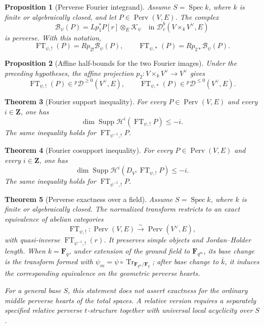 \documentclass[10pt]{article}
\newtheorem{theorem}{Theorem}[section]
\newtheorem{proposition}[theorem]{Proposition}
\theoremstyle{definition}
\newcommand{\Fq}{\mathbf F_q}
\newcommand{\Db}{\mathcal D}
\newcommand{\Dbc}{\mathcal D^b_c}
\newcommand{\FT}{\operatorname{FT}}
\newcommand{\Tr}{\operatorname{Tr}}
\newcommand{\Spec}{\operatorname{Spec}}
\newcommand{\Perv}{\operatorname{Perv}}
\begin{document}
\begin{proposition}[Perverse Fourier integrand]
Assume \(S=\Spec k\), where \(k\) is finite or algebraically closed, and let
\(P\in\Perv(V,E)\).  The complex
\[
 \mathcal B_\psi(P)=Lp_1^*P[r]\otimes_E\mathcal K_\psi
 \quad\text{in }\Dbc(V\times_kV^\vee,E)
\]
is perverse.  With this notation,
\[
 \FT_{\psi,!}(P)=Rp_{2!}\mathcal B_\psi(P),
 \qquad
 \FT_{\psi,*}(P)=Rp_{2*}\mathcal B_\psi(P).
\]
\end{proposition}

\begin{proposition}[Affine half-bounds for the two Fourier images]
Under the preceding hypotheses, the affine projection
\(p_2:V\times_kV^\vee\to V^\vee\) gives
\[
 \FT_{\psi,!}(P)\in{}^p\Db^{\ge0}(V^\vee,E),
 \qquad
 \FT_{\psi,*}(P)\in{}^p\Db^{\le0}(V^\vee,E).
\]
\end{proposition}

\begin{theorem}[Fourier support inequality]
For every \(P\in\Perv(V,E)\) and every \(i\in\mathbf Z\), one has
\[
 \dim\operatorname{Supp}\mathcal H^i(\FT_{\psi,!}P)\le-i.
\]
The same inequality holds for \(\FT_{\psi^{-1},!}P\).
\end{theorem}

\begin{theorem}[Fourier cosupport inequality]
For every \(P\in\Perv(V,E)\) and every \(i\in\mathbf Z\), one has
\[
 \dim\operatorname{Supp}
 \mathcal H^i\!\left(D_{V^\vee}\FT_{\psi,!}P\right)\le-i.
\]
The same inequality holds for \(\FT_{\psi^{-1},!}P\).
\end{theorem}

\begin{theorem}[Perverse exactness over a field]
Assume \(S=\Spec k\), where \(k\) is finite or algebraically closed.  The
normalized transform restricts to an exact
equivalence of abelian categories
\[
 \FT_{\psi,!}:\Perv(V,E)
 \xrightarrow{\ \sim\ }
 \Perv(V^\vee,E),
\]
with quasi-inverse \(\FT_{\psi^{-1},!}(r)\).  It preserves simple objects and
Jordan--Holder length.  When \(k=\Fq\), under extension of the ground field
to \(\mathbf F_{q^m}\), its base change is the transform formed with
\(\psi_m=\psi\circ\Tr_{\mathbf F_{q^m}/\Fq}\); after base change to
\(\bar k\), it induces the corresponding equivalence on the geometric
perverse hearts.

For a general base \(S\), this statement does not assert exactness for the
ordinary middle perverse hearts of the total spaces.  A relative version
requires a separately specified relative perverse \(t\)-structure together
with universal local acyclicity over \(S\).
\end{theorem}
\end{document}
